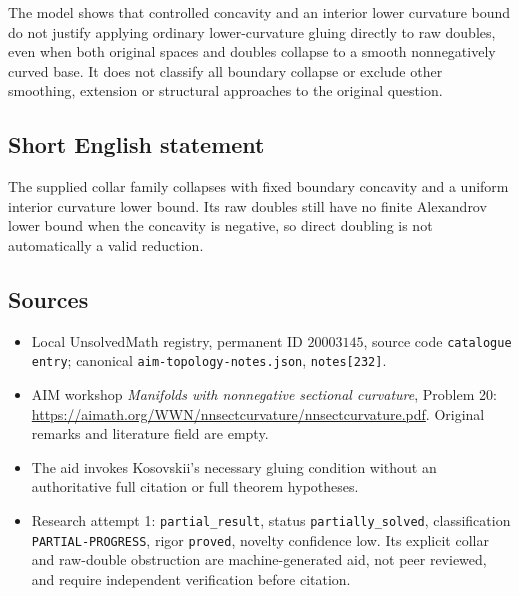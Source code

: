 \documentclass[11pt]{article}
\begin{document}
The model shows that controlled concavity and an interior lower curvature bound do not justify applying ordinary lower-curvature gluing directly to raw doubles, even when both original spaces and doubles collapse to a smooth nonnegatively curved base. It does not classify all boundary collapse or exclude other smoothing, extension or structural approaches to the original question.
\subsection{Short English statement}
The supplied collar family collapses with fixed boundary concavity and a uniform interior curvature lower bound. Its raw doubles still have no finite Alexandrov lower bound when the concavity is negative, so direct doubling is not automatically a valid reduction.
\subsection{Sources}
\begin{itemize}
\item Local UnsolvedMath registry, permanent ID $20003145$, source code \texttt{catalogue entry}; canonical \texttt{aim-topology-notes.json}, \texttt{notes[232]}.
\item AIM workshop \emph{Manifolds with nonnegative sectional curvature}, Problem 20: \url{https://aimath.org/WWN/nnsectcurvature/nnsectcurvature.pdf}. Original remarks and literature field are empty.
\item The aid invokes Kosovskii's necessary gluing condition without an authoritative full citation or full theorem hypotheses.
\item Research attempt 1: \texttt{partial\_result}, status \texttt{partially\_solved}, classification \texttt{PARTIAL-PROGRESS}, rigor \texttt{proved}, novelty confidence low. Its explicit collar and raw-double obstruction are machine-generated aid, not peer reviewed, and require independent verification before citation.
\end{itemize}
\end{document}
